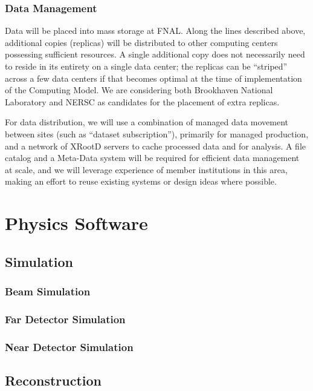 \subsubsection{Data Management}
\label{sec:detectors-sc-infrastructure-computing-model-data-mgt}

Data will be placed into mass storage at FNAL. Along the lines described above, additional copies (replicas) will be distributed to other
computing centers possessing sufficient resources.
A single additional copy does not necessarily need to reside in its entirety on a single data center; the replicas can be ``striped'' across a few data centers if that becomes optimal
at the time of implementation of the Computing Model. We are considering both Brookhaven National Laboratory and NERSC as candidates for the placement of extra replicas.

For data distribution, we will use a combination of managed data movement between sites (such as ``dataset subscription''), primarily for managed production, and a network of XRootD
servers to cache processed data and for analysis. A file catalog and a Meta-Data system will be required for efficient data management at scale, and we will leverage experience of
member institutions in this area, making an effort to reuse existing systems or design ideas where possible.


\section{Physics Software}
\label{sec:detectors-sc-physics-software}

\subsection{Simulation}
\label{sec:detectors-sc-physics-software-simulation}

\subsubsection{Beam Simulation}
\label{sec:detectors-sc-physics-software-simulation-beam}

\subsubsection{Far Detector Simulation}
\label{sec:detectors-sc-physics-software-simulation-fd}


\subsubsection{Near Detector Simulation}
\label{sec:detectors-sc-physics-software-simulation-nd}
 


\subsection{Reconstruction}
\label{sec:detectors-sc-physics-software-reco}



